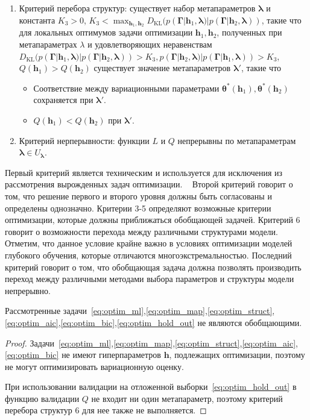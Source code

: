 \begin{defin}
\begin{enumerate}
\item Критерий перебора структур: существует набор метапараметров $\boldsymbol{\lambda}$ и константа $K_3>0$, $K_3 < \max_{\mathbf{h}_1, \mathbf{h}_2} D_\text{KL}(p (\boldsymbol{\Gamma}|\mathbf{h}_1, \boldsymbol{\lambda}) | p (\boldsymbol{\Gamma}|\mathbf{h}_2, \boldsymbol{\lambda}))$, такие что для локальных оптимумов задачи оптимизации $\mathbf{h}_{1}, \mathbf{h}_2$, полученных при метапараметрах $\lambda$ и удовлетворяющих неравенствам $D_\text{KL}(p (\boldsymbol{\Gamma}|\mathbf{h}_1, \boldsymbol{\lambda})| p (\boldsymbol{\Gamma}|\mathbf{h}_2, \boldsymbol{\lambda})) > K_3, p(\boldsymbol{\Gamma}|\mathbf{h}_2, \boldsymbol{\lambda})| p(\boldsymbol{\Gamma}|\mathbf{h}_1, \boldsymbol{\lambda})) > K_3$, $Q(\mathbf{h}_1) > Q(\mathbf{h}_2)$  существует значение метапараметров $\boldsymbol{\lambda}'$, такие что
\begin{itemize}
\item Соответствие между вариационными параметрами $\boldsymbol{\theta}^{*}(\mathbf{h}_1), \boldsymbol{\theta}^{*}(\mathbf{h}_2)$ сохраняется при  $\boldsymbol{\lambda}'$.
\item  $Q(\mathbf{h}_1) < Q(\mathbf{h}_2)$ при $\boldsymbol{\lambda}'$.
\end{itemize}


\item Критерий нерперывности: функции $L$ и $Q$ непрерывны по метапараметрам $\boldsymbol{\lambda} \in U_{\boldsymbol{\lambda}}$.
\end{enumerate}
\end{defin}
Первый критерий является техническим и используется для исключения из рассмотрения вырожденных задач оптимизации.  
Второй критерий говорит о том, что решение первого и второго уровня должны быть согласованы и определены однозначно.
Критерии 3-5 определяют возможные критерии оптимизации, которые должны приближаться обобщающей задачей.
Критерий 6 говорит о возможности перехода между различными структурами модели. Отметим, что данное условие крайне важно в условиях оптимизации моделей глубокого обучения, которые отличаются многоэкстремальностью.
Последний критерий говорит о том, что обобщающая задача должна позволять производить переход между различными методами выбора  параметров и структуры модели непрерывно.

\begin{theorem}Рассмотренные задачи~\eqref{eq:optim_ml},\eqref{eq:optim_map},\eqref{eq:optim_struct},\eqref{eq:optim_aic},\eqref{eq:optim_bic},\eqref{eq:optim_hold_out} не являются обобщающими.
\end{theorem}
\begin{proof}
Задачи~\eqref{eq:optim_ml},\eqref{eq:optim_map},\eqref{eq:optim_struct},\eqref{eq:optim_aic},\eqref{eq:optim_bic} не имеют гиперпараметров $\mathbf{h}$, подлежащих оптимизации, поэтому не могут оптимизировать вариационную оценку.

При  использовании валидации на отложенной выборки~\eqref{eq:optim_hold_out} в функцию валидации $Q$ не входит ни один метапараметр, поэтому критерий перебора структур 6 для нее также не выполняется. 

\end{proof}

